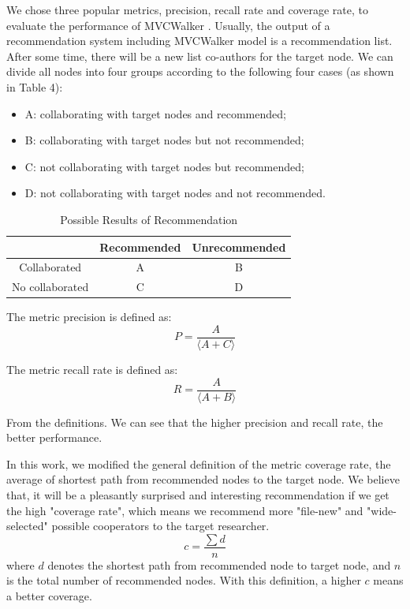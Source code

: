 \documentclass[10pt,journal,compsoc]{IEEEtran}
\begin{document}
We chose three popular metrics, precision, recall rate and coverage rate, to evaluate the performance of MVCWalker \cite{Fouss:web, Shani:recommender}. Usually, the output of a recommendation system including MVCWalker model is a recommendation list. After some time, there will be a new list co-authors for the target node. We can divide all nodes into four groups according to the following four cases (as shown in Table 4):
\begin{itemize}
\item A: collaborating with target nodes and recommended;
\item B: collaborating with target nodes but not recommended;
\item C: not collaborating with target nodes but recommended;
\item D: not collaborating with target nodes and not recommended.
\end{itemize}
\begin{table}
\renewcommand{\arraystretch}{1.2}
\centering
\caption{Possible Results of Recommendation}
\begin{tabular}{ |c|c|c|} \hline
                 &Recommended &Unrecommended\\ \hline
Collaborated    & A          & B\\ \hline
No collaborated & C          & D\\
\hline\end{tabular}
\end{table}

The metric precision is defined as:
\begin{equation}
P=\frac {A}{\langle A+C \rangle}
\end{equation}

The metric recall rate is defined as:
\begin{equation}
R=\frac {A}{\langle A+B \rangle}
\end{equation}

From the definitions. We can see that the higher precision and recall rate, the better performance.

In this work, we modified the general definition of the metric coverage rate, the average of shortest path from recommended nodes to the target node. We believe that, it will be a pleasantly surprised and interesting recommendation if we get the high "coverage rate", which means we recommend more "file-new" and "wide-selected" possible cooperators to the target researcher.
\begin{equation}
c=\frac {\sum d}{n}
\end{equation}
where $d$ denotes the shortest path from recommended node to target node, and $n$ is the total number of recommended nodes. With this definition, a higher $c$ means a better coverage.
\end{document}

